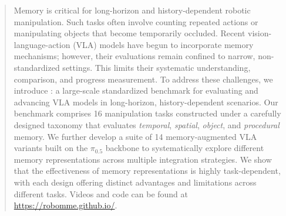 \begin{abstract}
Memory is critical for long-horizon and history-dependent robotic manipulation.
Such tasks often involve counting repeated actions or manipulating objects that become temporarily occluded.
Recent vision-language-action (VLA) models have begun to incorporate memory mechanisms; however, their evaluations remain confined to narrow, non-standardized settings. This limits their systematic understanding, comparison, and progress measurement.
To address these challenges, we introduce \textbf{\benchname}: a large-scale standardized benchmark for evaluating and advancing VLA models in long-horizon, history-dependent scenarios. Our benchmark comprises 16 manipulation tasks constructed under a carefully designed taxonomy that evaluates \textit{temporal}, \textit{spatial}, \textit{object}, and \textit{procedural} memory.
We further develop a suite of 14 memory-augmented VLA variants built on the $\pi_{0.5}$ backbone to systematically explore different memory representations across multiple integration strategies.
We show that the effectiveness of memory representations is highly task-dependent, with each design offering distinct advantages and limitations across different tasks.
Videos and code can be found at \url{https://robomme.github.io/}.
\end{abstract}

